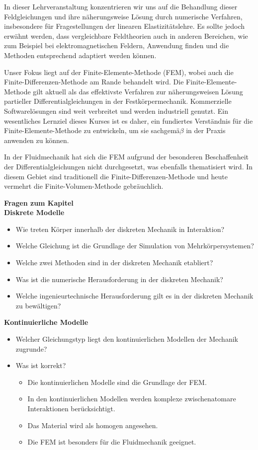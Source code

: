 In dieser Lehrveranstaltung konzentrieren wir uns auf die Behandlung dieser Feldgleichungen und ihre näherungsweise Lösung durch numerische Verfahren, insbesondere für Fragestellungen der linearen Elastizitätslehre. Es sollte jedoch erwähnt werden, dass vergleichbare Feldtheorien auch in anderen Bereichen, wie zum Beispiel bei elektromagnetischen Feldern, Anwendung finden und die Methoden entsprechend adaptiert werden können.

Unser Fokus liegt auf der Finite-Elemente-Methode (FEM), wobei auch die Finite-Differenzen-Methode am Rande behandelt wird. Die Finite-Elemente-Methode gilt aktuell als das effektivste Verfahren zur näherungsweisen Lösung partieller Differentialgleichungen in der Festkörpermechanik. Kommerzielle Softwarelösungen sind weit verbreitet und werden industriell genutzt. Ein wesentliches Lernziel dieses Kurses ist es daher, ein fundiertes Verständnis für die Finite-Elemente-Methode zu entwickeln, um sie sachgemä$\beta$ in der Praxis anwenden zu können.

In der Fluidmechanik hat sich die FEM aufgrund der besonderen Beschaffenheit der Differentialgleichungen nicht durchgesetzt, was ebenfalls thematisiert wird. In diesem Gebiet sind traditionell die Finite-Differenzen-Methode und heute vermehrt die Finite-Volumen-Methode gebräuchlich.


\begin{framed}
\textbf{Fragen zum Kapitel}\\
\textbf{Diskrete Modelle}

\begin{itemize}
\item Wie treten Körper innerhalb der diskreten Mechanik in Interaktion?
\item Welche Gleichung ist die Grundlage der Simulation von  Mehrkörpersystemen?
\item Welche zwei Methoden sind in der diskreten Mechanik etabliert?
\item Was ist die numerische Herausforderung in der diskreten Mechanik?
\item Welche ingenieurtechnische Herausforderung gilt es in der diskreten Mechanik zu bewältigen?
\end{itemize}

\textbf{Kontinuierliche Modelle}

\begin{itemize}
\item Welcher Gleichungstyp liegt den kontinuierlichen Modellen der Mechanik zugrunde?
\item Was ist korrekt?\begin{itemize}
\item Die kontinuierlichen Modelle sind die Grundlage der FEM.
\item In den kontinuierlichen Modellen werden komplexe zwischenatomare Interaktionen berücksichtigt.
\item Das Material wird als homogen angesehen.
\item Die FEM ist besonders für die Fluidmechanik geeignet.
\end{itemize}
\end{itemize}
\end{framed}
